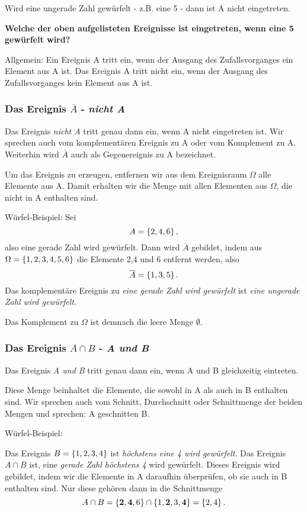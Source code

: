 Wird eine ungerade Zahl gewürfelt - z.B. eine 5 - dann ist A nicht eingetreten. 
\begin{center}
	\textbf{ Welche der oben aufgelisteten Ereignisse ist eingetreten, wenn eine 5 gewürfelt wird?}
\end{center}


Allgemein: Ein Ereignis A tritt ein, wenn der Ausgang des Zufallsvorganges ein Element aus A ist. Das Ereignis A tritt nicht ein, wenn der Ausgang des Zufallsvorganges kein Element aus A ist.

\subsubsection{Das Ereignis $\overline{A}$ - \emph{nicht A}}

Das Ereignis \emph{nicht A} tritt genau dann ein, wenn A nicht eingetreten ist. Wir sprechen auch vom komplementären Ereignis zu A oder vom Komplement zu A. Weiterhin wird $\overline{A}$ auch als Gegenereignis zu A bezeichnet.

Um das Ereignis zu erzeugen, entfernen wir aus dem Ereignisraum $\Omega$ alle Elemente aus A. Damit erhalten wir die Menge mit allen Elementen aus $\Omega$, die nicht in A enthalten sind. 

Würfel-Beispiel: Sei $$A = \gkl{2,4,6},$$ 
also eine gerade Zahl wird gewürfelt. Dann wird $\overline{A}$ gebildet, indem aus $\Omega = \gkl{1,2,3,4,5,6}$ die Elemente 2,4 und 6 entfernt werden, also
 $$\overline{A}=\gkl{1,3,5}.$$
Das komplementäre Ereignis zu \emph{eine gerade Zahl wird gewürfelt} ist \emph{eine ungerade Zahl wird gewürfelt}. 

Das Komplement zu $\Omega$ ist demnach die leere Menge $\emptyset$.

\subsubsection{Das Ereignis $A \cap B$ - \emph{A und B}}

Das Ereignis  \emph{A und B} tritt genau dann ein, wenn A und B gleichzeitig eintreten. 

Diese Menge beinhaltet die Elemente, die sowohl in A als auch in B enthalten sind. Wir sprechen auch vom Schnitt, Durchschnitt oder Schnittmenge der beiden Mengen und sprechen: A geschnitten B. 

Würfel-Beispiel:
 
Das Ereignis $B=\gkl{1,2,3,4}$ ist \emph{höchstens eine 4 wird gewürfelt}. Das Ereignis $A\cap B$ ist, eine \emph{gerade Zahl höchstens 4} wird gewürfelt. Dieses Ereignis wird gebildet, indem wir die Elemente in A daraufhin überprüfen, ob sie auch in B enthalten sind. Nur diese gehören dann in die Schnittmenge
$$A\cap B = \gkl{\textbf{2},\textbf{4},6}\cap \gkl{1,\textbf{2},3,\textbf{4}} = \gkl{2,4}.$$

